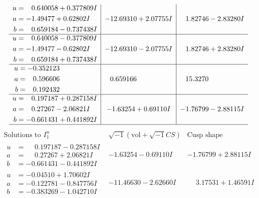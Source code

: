 \documentclass[1p]{elsarticle_modified}
\theoremstyle{definition}
\newcommand{\I}{\sqrt{-1}}
\begin{document}
$$\begin{array}{c|c|c}
\begin{aligned}
u &= \phantom{-}0.640058 + 0.377809 I \\
a &= -1.49477 + 0.62802 I \\
b &= \phantom{-}0.659184 - 0.737438 I\end{aligned}
 & -12.69310 + 2.07755 I & \phantom{-}1.82746 - 2.83280 I \\ \hline\begin{aligned}
u &= \phantom{-}0.640058 - 0.377809 I \\
a &= -1.49477 - 0.62802 I \\
b &= \phantom{-}0.659184 + 0.737438 I\end{aligned}
 & -12.69310 - 2.07755 I & \phantom{-}1.82746 + 2.83280 I \\ \hline\begin{aligned}
u &= -0.352123\phantom{ +0.000000I} \\
a &= \phantom{-}0.596606\phantom{ +0.000000I} \\
b &= \phantom{-}0.192432\phantom{ +0.000000I}\end{aligned}
 & \phantom{-}0.659166\phantom{ +0.000000I} & \phantom{-}15.3270\phantom{ +0.000000I} \\ \hline\begin{aligned}
u &= \phantom{-}0.197187 + 0.287158 I \\
a &= \phantom{-}0.27267 - 2.06821 I \\
b &= -0.661431 + 0.441892 I\end{aligned}
 & -1.63254 + 0.69110 I & -1.76799 - 2.88115 I\\
 \hline 
 \end{array}$$\newpage$$\begin{array}{c|c|c}  
\text{Solutions to }I^u_{1}& \I (\text{vol} + \sqrt{-1}CS) & \text{Cusp shape}\\
 \hline 
\begin{aligned}
u &= \phantom{-}0.197187 - 0.287158 I \\
a &= \phantom{-}0.27267 + 2.06821 I \\
b &= -0.661431 - 0.441892 I\end{aligned}
 & -1.63254 - 0.69110 I & -1.76799 + 2.88115 I \\ \hline\begin{aligned}
u &= -0.04510 + 1.70602 I \\
a &= -0.122781 - 0.847756 I \\
b &= -0.383269 - 1.042710 I\end{aligned}
 & -11.46630 - 2.62660 I & \phantom{-}3.17531 + 1.46591 I \\ \hline\begin{aligned}

\end{aligned}
\end{array}$$
\end{document}
